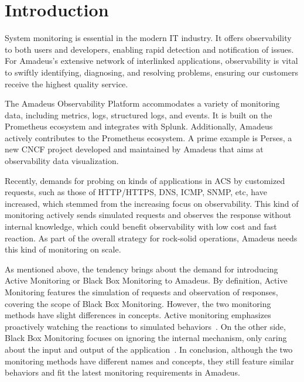 
\chapter{Introduction}\label{chapter:introduction}

System monitoring is essential in the modern \ac{IT} industry. It offers observability to both users and developers, enabling rapid detection and notification of issues. For Amadeus's extensive network of interlinked applications, observability is vital to swiftly identifying, diagnosing, and resolving problems, ensuring our customers receive the highest quality service. 

The Amadeus Observability Platform accommodates a variety of monitoring data, including metrics, logs, structured logs, and events. It is built on the Prometheus ecosystem and integrates with Splunk. Additionally, Amadeus actively contributes to the Prometheus ecosystem. A prime example is Perses, a new CNCF project developed and maintained by Amadeus that aims at observability data visualization. 

Recently, demands for probing on kinds of applications in \ac{ACS} by customized requests, such as those of \ac{HTTP}/\ac{HTTPS}, \ac{DNS}, \ac{ICMP}, \ac{SNMP}, etc, have increased, which stemmed from the increasing focus on observability. This kind of monitoring actively sends simulated requests and observes the response without internal knowledge, which could benefit observability with low cost and fast reaction. As part of the overall strategy for rock-solid operations, Amadeus needs this kind of monitoring on scale. 

As mentioned above, the tendency brings about the demand for introducing Active Monitoring or Black Box Monitoring to Amadeus. By definition, Active Monitoring features the simulation of requests and observation of responses, covering the scope of Black Box Monitoring. However, the two monitoring methods have slight differences in concepts. Active monitoring emphasizes proactively watching the reactions to simulated behaviors~\parencite{splunkActiveVsPassive2023}. On the other side, Black Box Monitoring focuses on ignoring the internal mechanism, only caring about the input and output of the application~\parencite{beyerSiteReliabilityEngineering2016}. In conclusion, although the two monitoring methods have different names and concepts, they still feature similar behaviors and fit the latest monitoring requirements in Amadeus. 

